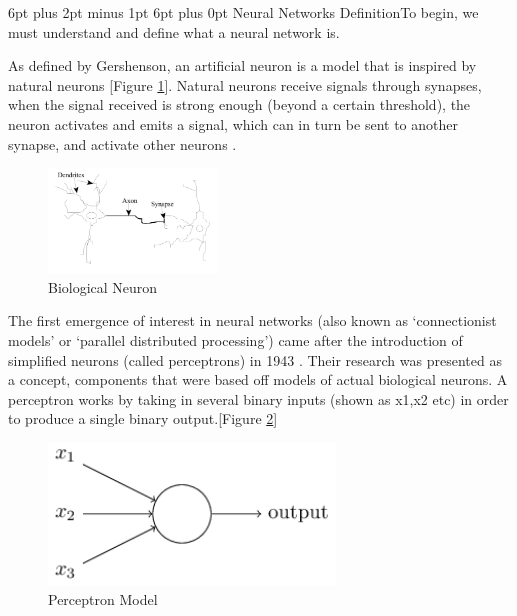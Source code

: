 \documentclass[12pt,a4paper]{article}
\makeatletter
\renewcommand\subsection{\@startsection {subsection}{1}{2mm} %
                               {6pt plus 2pt minus 1pt} %
                               {6pt plus 0pt} %
                               {\normalfont\bfseries}}
\makeatother
\begin{document}
\subsection{Neural Networks Definition}To begin, we must understand and define what a neural network is.\par
As defined by Gershenson, an artificial neuron is a model that is inspired by natural neurons [Figure \ref{fig:5}]. Natural neurons receive signals through synapses, when the signal received is strong enough (beyond a certain threshold), the neuron activates and emits a signal, which can in turn be sent to another synapse, and activate other neurons \cite{gershenson_artificial_2003}.\par
\begin{figure}[h]
	\includegraphics[width=0.4\textwidth]{neuron}
	\centering
	\caption{Biological Neuron \protect \cite{gershenson_artificial_2003}}
	\label{fig:5}
\end{figure}
The first emergence of interest in neural networks (also known as ‘connectionist models’ or ‘parallel distributed processing’) \cite{ben_krose_introduction_1993} came after the introduction of simplified neurons (called perceptrons) in 1943 \cite{mcculloch_logical_1943}. Their research was presented as a concept, components that were based off models of actual biological neurons. A perceptron works by taking in several binary inputs (shown as x1,x2 etc)  in order to produce a single binary output.[Figure \ref{fig:1}]
\begin{figure}[ht]
	\includegraphics[width=0.68\textwidth]{perceptron}
	\centering
	\caption{Perceptron Model \protect \cite{nielsenneural}}
	\label{fig:1}
\end{figure}
\par
\end{document}
